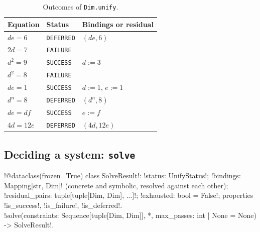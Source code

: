 \begin{table}[H]
\centering\small
\begin{tabular}{@{}lll@{}}
\toprule
Equation & Status & Bindings or residual \\
\midrule
$de=6$ & \texttt{DEFERRED} & $(de,6)$ \\
$2d=7$ & \texttt{FAILURE} & \\
$d^2=9$ & \texttt{SUCCESS} & $d:=3$ \\
$d^2=8$ & \texttt{FAILURE} & \\
$de=1$ & \texttt{SUCCESS} & $d:=1$, $e:=1$ \\
$d^n=8$ & \texttt{DEFERRED} & $(d^n,8)$ \\
$de=df$ & \texttt{SUCCESS} & $e:=f$ \\
$4d=12e$ & \texttt{DEFERRED} & $(4d,12e)$ \\
\bottomrule
\end{tabular}
\caption{Outcomes of \texttt{Dim.unify}.}\label{tab:algebra-unify-examples}
\end{table}

\subsection{Deciding a system: \texttt{solve}}\label{sec:algebra-solve}

\begin{signature}
\py!@dataclass(frozen=True) class SolveResult!: \py!status: UnifyStatus!; \py!bindings: Mapping[str, Dim]! (concrete and symbolic, resolved against each other); \py!residual_pairs: tuple[tuple[Dim, Dim], ...]!; \py!exhausted: bool = False!; properties \py!is_success!, \py!is_failure!, \py!is_deferred!.\\
\py!solve(constraints: Sequence[tuple[Dim, Dim]], *, max_passes: int | None = None) -> SolveResult!.
\end{signature}

